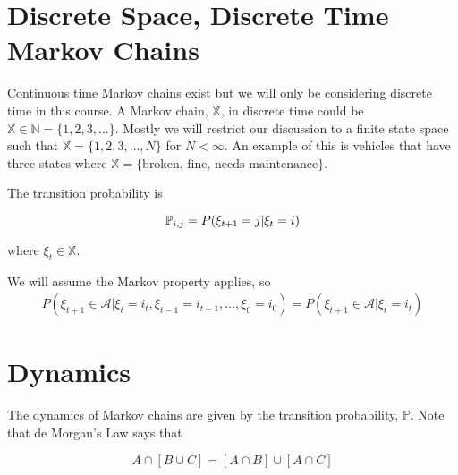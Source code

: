 \mainmatter%
\setcounter{page}{1}

\lectureseries[\course]{\course}

\date{October 27, 2009}

\setaddress%

\setcounter{lecture}{8}
\setcounter{chapter}{8}


\section{Discrete Space, Discrete Time Markov Chains}
Continuous time Markov chains exist but we will only be considering discrete time in this course.
A Markov chain, $\mathbb{X}$, in discrete time could be $\mathbb{X}\in\mathbb{N}=\{1,2,3,\ldots\}$.
Mostly we will restrict our discussion to a finite state space such that $\mathbb{X}=\{1,2,3,\ldots,N\}$ for $N<\infty$.
An example of this is vehicles that have three states where $\mathbb{X}=\{\text{broken,~fine,~needs~maintenance}\}$.

\begin{definition}
The transition probability is

\begin{equation*}
\mathbb{P}_{i,j} = P(\xi_{t+1}=j|\xi_t=i)
\end{equation*}

where $\xi_t\in\mathbb{X}$.
\end{definition}

We will assume the Markov property applies, so
\begin{align*}
P(\xi_{t+1}\in\mathcal{A} | \xi_t=i_t, \xi_{t-1}=i_{t-1},\ldots,\xi_0=i_0) = P(\xi_{t+1}\in\mathcal{A}|\xi_t=i_t)
\end{align*}

\section{Dynamics}
The dynamics of Markov chains are given by the transition probability, $\mathbb{P}$.
Note that de Morgan's Law says that

\begin{equation*}
A\cap[B\cup C] = [A\cap B] \cup [A\cap C]
\end{equation*}

